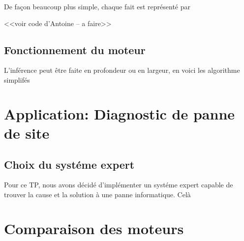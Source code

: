 \documentclass[a4paper, 12pt, leqno]{report}
\theoremstyle{plain}
\begin{document}
De façon beaucoup plus simple, chaque fait est représenté par

<<voir code d'Antoine -- a faire>>

 \section{Fonctionnement du moteur}

L'inférence peut être faite en profondeur ou en largeur, en voici les algorithme simplifés


\chapter{Application: Diagnostic de panne de site}
 \section{Choix du systéme expert}

Pour ce TP, nous avons décidé d'implémenter un systéme expert capable de trouver la cause et la solution à une panne informatique. Celà

 \chapter{Comparaison des moteurs}
                
\end{document}
